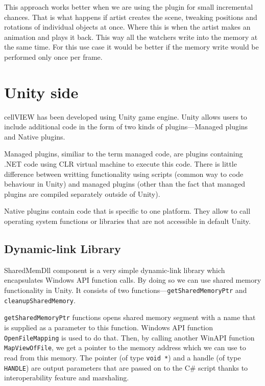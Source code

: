 \documentclass[
  digital, %
  table,   %
  nolof,     %
  nolot,     %
]{fithesis3}
\begin{document}
This approach works better when we are using the plugin for small incremental chances. That is what happens if artist creates the scene, tweaking positions and rotations of individual objects at once. Where this is when the artist makes an animation and plays it back. This way all the watchers write into the memory at the same time. For this use case it would be better if the memory write would be performed only once per frame.

\section{Unity side}
cellVIEW has been developed using Unity game engine. Unity allows users to include additional code in the form of two kinds of plugins—Managed plugins and Native plugins.

Managed plugins, similiar to the term managed code, are plugins containing .NET code using CLR virtual machine to execute this code. There is little difference between writting functionality using scripts (common way to code behaviour in Unity) and managed plugins (other than the fact that managed plugins are compiled separately outside of Unity).

Native plugins contain code that is specific to one platform. They allow to call operating system functions or libraries that are not accessible in default Unity.

\subsection{Dynamic-link Library}
SharedMemDll component is a very simple dynamic-link library which encapsulates Windows API function calls. By doing so we can use shared memory functionality in Unity. It consists of two functions—\texttt{getSharedMemoryPtr} and \texttt{cleanupSharedMemory}.

\texttt{getSharedMemoryPtr} functions opens shared memory segment with a name that is supplied as a parameter to this function. Windows API function \texttt{OpenFileMapping} is used to do that. Then, by calling another WinAPI function \texttt{MapViewOfFile}, we get a pointer to the memory address which we can use to read from this memory. The pointer (of type \texttt{void *}) and a handle (of type \texttt{HANDLE}) are output parameters that are passed on to the C\# script thanks to interoperability feature and marshaling.
\end{document}
